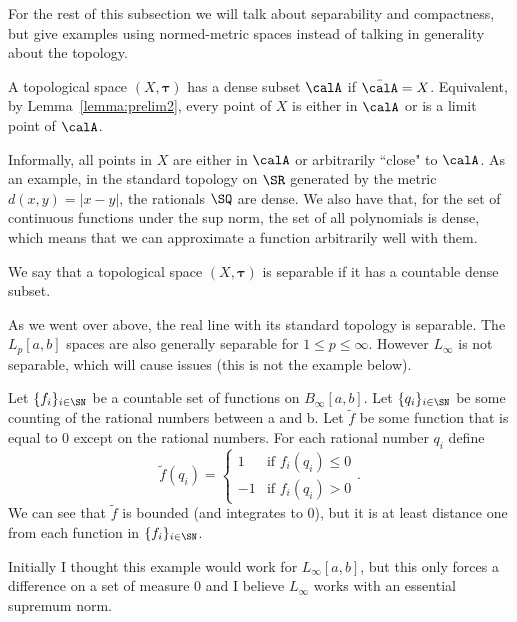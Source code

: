 For the rest of this subsection we will talk about separability and compactness, but give examples using normed-metric spaces instead of talking in generality about the topology.

\begin{definition}
	\label{def:dense}
	A topological space \((X,\boldsymbol{\tau})\) has a dense subset \(\calA\) if  \(\bar{\calA} = X\). Equivalent, by Lemma~\ref{lemma:prelim2}, every point of  \(X\) is either in  \(\calA\) or is a limit point of  \(\calA\).
\end{definition}
Informally, all points in \(X\) are either in \(\calA\) or arbitrarily ``close" to \(\calA\). As an example, in the standard topology on \(\SR\) generated by the metric \(d(x,y) = |x-y|\), the rationals \(\SQ\) are dense. We also have that, for the set of continuous functions under the sup norm, the set of all polynomials is dense, which means that we can approximate a function arbitrarily well with them.

\begin{definition}
	\label{def:seperable}
	We say that a topological space \((X,\boldsymbol{\tau})\) is separable if it has a countable dense subset.
\end{definition}
As we went over above, the real line with its standard topology is separable. The \(L_p[a,b]\) spaces are also generally separable for  \(1 \leq p \leq \infty\). However \(L_\infty\) is not separable, which will cause issues (this is not the example below).


\begin{example}
	\label{ex:notseperable}
	Let \(\{f_i\}_{i\in\SN}\) be a countable set of functions on \(B_\infty[a,b]\). Let  \(\{q_i\}_{i\in\SN}\) be some counting of the rational numbers between a and b. Let \(\tilde f\) be some function that is equal to 0 except on the rational numbers. For each rational number  \(q_i\) define 
	 \[
		 \tilde{f}(q_i) = \begin{cases}
			 1 & \text{if }f_i(q_i) \leq 0 \\
			 -1 & \text{if }f_i(q_i) > 0
	    \end{cases}
	.\] 
	We can see that \(\tilde{f}\) is bounded (and integrates to 0), but it is at least distance one from each function in \(\{f_i\}_{i\in\SN}\).
\end{example}

Initially I thought this example would work for \(L_\infty[a,b]\), but this only forces a difference on a set of measure 0 and I believe \(L_\infty\) works with an essential supremum norm.

